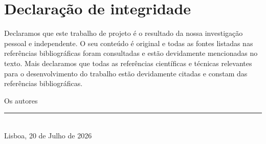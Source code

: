 

\chapter{Declaração de integridade}

Declaramos que este trabalho de projeto é o
resultado da nossa investigação pessoal e independente. O seu conteúdo é
original e todas as fontes listadas nas referências bibliográficas foram
consultadas e estão devidamente mencionadas no texto. Mais declaramos que todas as
referências científicas e técnicas relevantes para o desenvolvimento do trabalho
estão devidamente citadas e constam das referências bibliográficas.\vspace{24pt}

\begin{center}
	Os autores\\\vspace{24pt}
	\rule{8cm}{.3pt}\\
	Lisboa, 20 de Julho de 2026
\end{center}

